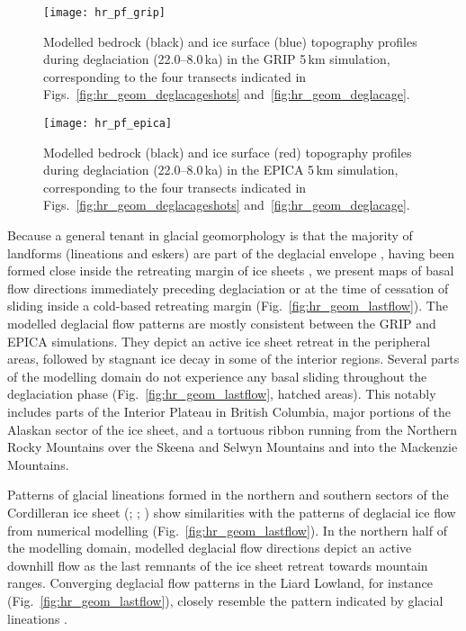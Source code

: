 \documentclass[tc, manuscript]{copernicus}
\begin{document}
\begin{figure}
  \texttt{[image: hr\_pf\_grip]}
  \caption{Modelled bedrock (black) and ice surface (blue) topography profiles
           during deglaciation (22.0--8.0\,ka) in the GRIP 5\,km
           simulation, corresponding to the four transects indicated in
           Figs.~\ref{fig:hr_geom_deglacageshots} and~\ref{fig:hr_geom_deglacage}.}
  \label{fig:hr_pf_grip}
\end{figure}

\begin{figure}
  \texttt{[image: hr\_pf\_epica]}
  \caption{Modelled bedrock (black) and ice surface (red) topography profiles
           during deglaciation (22.0--8.0\,ka) in the EPICA 5\,km
           simulation, corresponding to the four transects indicated in
           Figs.~\ref{fig:hr_geom_deglacageshots} and~\ref{fig:hr_geom_deglacage}.}
  \label{fig:hr_pf_epica}
\end{figure}

Because a general tenant in glacial geomorphology is that the majority of
landforms (lineations and eskers) are part of the deglacial envelope
\citep[terminology from][]{Kleman.etal.2006}, having been formed
close inside the retreating margin of ice sheets \citep{Boulton.Clark.1990,
Kleman.etal.1997, Kleman.etal.2010}, we present maps of basal flow directions
immediately preceding deglaciation or at the time of cessation of sliding
inside a cold-based retreating margin (Fig.~\ref{fig:hr_geom_lastflow}). The
modelled deglacial flow patterns are mostly consistent between the GRIP and EPICA
simulations. They depict an active ice sheet retreat in the peripheral areas,
followed by stagnant ice decay in some of the interior regions. Several parts
of the modelling domain do not experience any basal sliding throughout the
deglaciation phase (Fig.~\ref{fig:hr_geom_lastflow}, hatched areas). This notably
includes parts of the Interior Plateau in British Columbia, major
portions of the Alaskan sector of the ice sheet, and a tortuous ribbon running
from the Northern Rocky Mountains over the Skeena and Selwyn Mountains and into
the Mackenzie Mountains.

Patterns of glacial lineations formed in the northern and southern sectors of
the Cordilleran ice sheet (\citealp{Prest.etal.1968};
\citealp[Fig.~1.12]{Clague.1989}; \citealp[Fig.~2]{Kleman.etal.2010}) show
similarities with the patterns of deglacial ice flow from numerical modelling
(Fig.~\ref{fig:hr_geom_lastflow}). In the northern half
of the modelling domain, modelled deglacial flow directions depict an
active downhill flow as the last remnants of the ice sheet retreat towards
mountain ranges. Converging deglacial flow patterns in the Liard
Lowland, for instance (Fig.~\ref{fig:hr_geom_lastflow}), closely resemble the pattern
indicated by glacial lineations \citep[Fig.~2]{Margold.etal.2013}.
\end{document}
